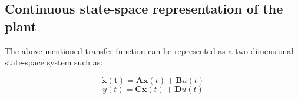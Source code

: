 \subsection{Continuous state-space representation of the plant}
\label{ss_representation}

The above-mentioned transfer function can be represented as a two dimensional state-space system such as: 

\begin{equation}
  \label{eq:ss_sys1}
    \mathbf{\dot{x}(t)} = \mathbf{A} \mathbf{x}(t) + \mathbf{B} u(t)
  \end{equation}
\begin{equation}
  \label{eq:ss_sys2}
    y(t) = \mathbf{C} \mathbf{x}(t) + \mathbf{D} u(t)
  \end{equation}


